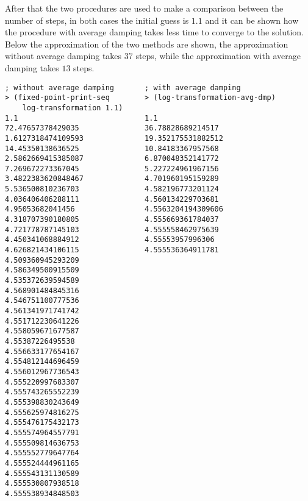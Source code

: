 After that the two procedures are used to make a comparison between the number of steps, in both cases the initial guess is $ 1.1 $
and it can be shown how the procedure with average damping takes less time to converge to the solution.
Below the approximation of the two methods are shown, the approximation without average damping takes $ 37 $ steps, while 
the approximation with average damping takes $ 13 $ steps.
\begin{lstlisting}
; without average damping       ; with average damping
> (fixed-point-print-seq        > (log-transformation-avg-dmp)       
    log-transformation 1.1)          
1.1                             1.1
72.47657378429035               36.78828689214517
1.6127318474109593              19.352175531882512
14.45350138636525               10.84183367957568
2.5862669415385087              6.870048352141772
7.269672273367045               5.227224961967156
3.4822383620848467              4.701960195159289
5.536500810236703               4.582196773201124
4.036406406288111               4.560134229703681
4.95053682041456                4.5563204194309606
4.318707390180805               4.555669361784037
4.721778787145103               4.555558462975639
4.450341068884912               4.55553957996306
4.626821434106115               4.555536364911781
4.509360945293209
4.586349500915509
4.535372639594589
4.568901484845316
4.546751100777536
4.561341971741742
4.551712230641226
4.558059671677587
4.55387226495538
4.556633177654167
4.554812144696459
4.556012967736543
4.555220997683307
4.555743265552239
4.555398830243649
4.555625974816275
4.555476175432173
4.555574964557791
4.555509814636753
4.555552779647764
4.555524444961165
4.555543131130589
4.555530807938518
4.555538934848503
\end{lstlisting} 

